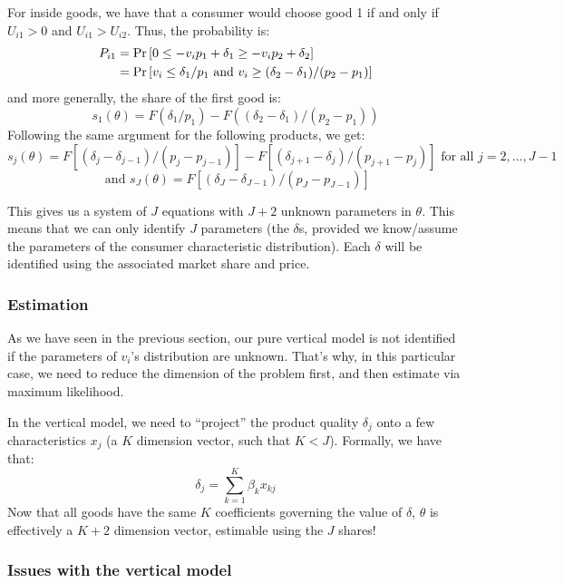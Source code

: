 For inside goods, we have that a consumer would choose good 1 if and only if $U_{i1} > 0$ and $U_{i1} > U_{i2}$. Thus, the probability is: \begin{align*}
P_{i1} & = \operatorname{Pr}\left[0 \leq -v_ip_1 + \delta_1 \geq -v_ip_2 + \delta_2\right] \\ & = \operatorname{Pr}\left[v_i \leq \delta_1/p_1 \text{ and } v_i \geq (\delta_2 - \delta_1)/(p_2 - p_1) \right]
\end{align*}
and more generally, the share of the first good is: $$s_1(\theta) = F(\delta_1/p_1) - F((\delta_2 - \delta_1)/(p_2 - p_1)) $$
Following the same argument for the following products, we get: $$ s_j(\theta) = F[(\delta_j - \delta_{j-1})/(p_j - p_{j-1})] - F[(\delta_{j+1} - \delta_j)/(p_{j+1} - p_j)] \text{ for all } j=2, ..., J-1 $$
$$ \text{ and } s_J(\theta) = F[(\delta_J - \delta_{J-1})/(p_J - p_{J-1})] $$

This gives us a system of $J$ equations with $J+2$ unknown parameters in $\theta$. This means that we can only identify $J$ parameters (the $\delta$s, provided we know/assume the parameters of the consumer characteristic distribution). Each $\delta$ will be identified using the associated market share and price.

\subsubsection{Estimation}

As we have seen in the previous section, our pure vertical model is not identified if the parameters of $v_i$'s distribution are unknown. That's why, in this particular case, we need to reduce the dimension of the problem first, and then estimate via maximum likelihood.

In the vertical model, we need to ``project'' the product quality $\delta_j$ onto a few characteristics $x_j$ (a $K$ dimension vector, such that $K < J$). Formally, we have that: $$ \delta_j = \sum_{k=1}^{K} \beta_k x_{kj} $$ Now that all goods have the same $K$ coefficients governing the value of $\delta$, $\theta$ is effectively a $K+2$ dimension vector, estimable using the $J$ shares!

\subsubsection{Issues with the vertical model}

